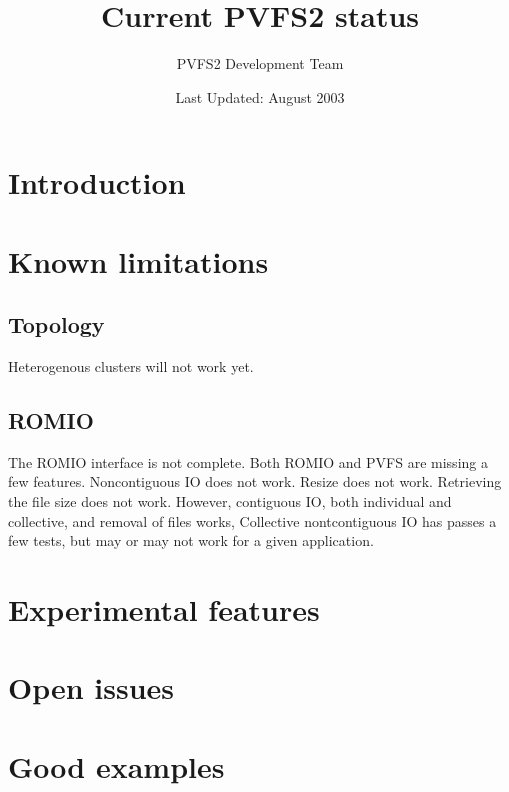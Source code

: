 \documentclass[11pt, letterpaper]{article}
\title{Current PVFS2 status}
\author{ PVFS2 Development Team }
\date{ Last Updated: August 2003 }
\begin{document}
\maketitle

\tableofcontents

\newpage

\thispagestyle{empty}

\setlength{\parindent}{0.0cm}

\section{Introduction}
\section{Known limitations}
\subsection{Topology}

Heterogenous clusters will not work yet.

\subsection{ROMIO}

The ROMIO interface is not complete.  Both ROMIO and PVFS are missing a few
features.  Noncontiguous IO does not work.   Resize does not work.   Retrieving
the file size does not work.  However, contiguous IO, both individual and
collective, and removal of files works,   Collective nontcontiguous IO has
passes a few tests, but may or may not work for a given application.  

\section{Experimental features}
\section{Open issues}
\section{Good examples}
\end{document}
